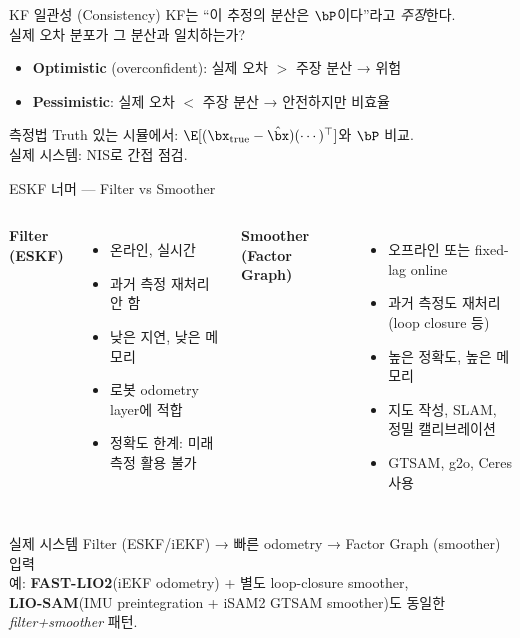 \begin{frame}{KF 일관성 (Consistency)}
  KF는 ``이 추정의 분산은 $\bP$이다''라고 \emph{주장}한다.\\
  실제 오차 분포가 그 분산과 일치하는가?
  \pause
  \vspace{0.3em}
  \begin{itemize}
    \item \textbf{Optimistic} (overconfident): 실제 오차 $>$ 주장 분산 → 위험
    \item \textbf{Pessimistic}: 실제 오차 $<$ 주장 분산 → 안전하지만 비효율
  \end{itemize}
  \pause
  \vspace{0.3em}
  \begin{block}{측정법}
    Truth 있는 시뮬에서: $\E[(\bx_\text{true}-\hat\bx)(\cdots)^\top]$와 $\bP$ 비교.\\
    실제 시스템: NIS로 간접 점검.
  \end{block}
\end{frame}

\begin{frame}{ESKF 너머 — Filter vs Smoother}
  \begin{columns}
    \textbf{Filter (ESKF)}
    \begin{itemize}\footnotesize
      \item 온라인, 실시간
      \item 과거 측정 재처리 안 함
      \item 낮은 지연, 낮은 메모리
      \item 로봇 odometry layer에 적합
      \item 정확도 한계: 미래 측정 활용 불가
    \end{itemize}

    \textbf{Smoother (Factor Graph)}
    \begin{itemize}\footnotesize
      \item 오프라인 또는 fixed-lag online
      \item 과거 측정도 재처리 (loop closure 등)
      \item 높은 정확도, 높은 메모리
      \item 지도 작성, SLAM, 정밀 캘리브레이션
      \item GTSAM, g2o, Ceres 사용
    \end{itemize}
  \end{columns}
  \pause
  \vspace{0.3em}
  \begin{block}{실제 시스템}
    Filter (ESKF/iEKF) → 빠른 odometry → Factor Graph (smoother) 입력\\
    예: \textbf{FAST-LIO2}(iEKF odometry) + 별도 loop-closure smoother,\\
    \textbf{LIO-SAM}(IMU preintegration + iSAM2 GTSAM smoother)도 동일한 \emph{filter+smoother} 패턴.
  \end{block}
\end{frame}

